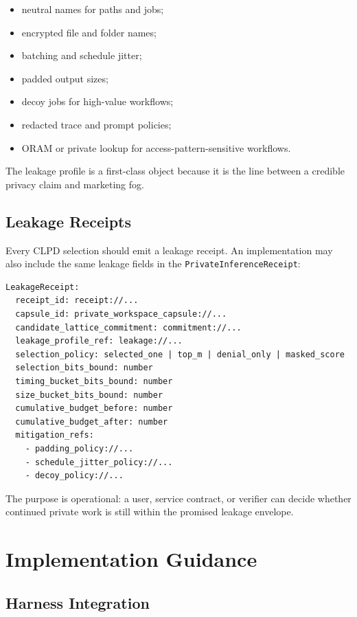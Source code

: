 \documentclass[11pt]{article}
\newcommand{\code}[1]{\texttt{#1}}
\begin{document}
\begin{itemize}[leftmargin=1.5em]
\item neutral names for paths and jobs;
\item encrypted file and folder names;
\item batching and schedule jitter;
\item padded output sizes;
\item decoy jobs for high-value workflows;
\item redacted trace and prompt policies;
\item ORAM or private lookup for access-pattern-sensitive workflows.
\end{itemize}

The leakage profile is a first-class object because it is the line between a
credible privacy claim and marketing fog.

\subsection{Leakage Receipts}

Every CLPD selection should emit a leakage receipt. An implementation may also
include the same leakage fields in the \code{PrivateInferenceReceipt}:

\begin{Verbatim}[fontsize=\small]
LeakageReceipt:
  receipt_id: receipt://...
  capsule_id: private_workspace_capsule://...
  candidate_lattice_commitment: commitment://...
  leakage_profile_ref: leakage://...
  selection_policy: selected_one | top_m | denial_only | masked_score
  selection_bits_bound: number
  timing_bucket_bits_bound: number
  size_bucket_bits_bound: number
  cumulative_budget_before: number
  cumulative_budget_after: number
  mitigation_refs:
    - padding_policy://...
    - schedule_jitter_policy://...
    - decoy_policy://...
\end{Verbatim}

The purpose is operational: a user, service contract, or verifier can decide
whether continued private work is still within the promised leakage envelope.

\section{Implementation Guidance}

\subsection{Harness Integration}
\end{document}
